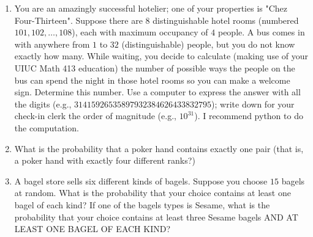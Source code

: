 \documentclass{report}
\begin{document}
{\begin{enumerate}
    \item You are an amazingly successful hotelier; one of your properties is "Chez Four-Thirteen".
          Suppose there are $8$ distinguishable hotel rooms (numbered $101, 102,\dots,108$), each with maximum
          occupancy of $4$ people. A bus comes in with anywhere from $1$ to $32$ (distinguishable) people, but you
          do not know exactly how many. While waiting, you decide to calculate (making use of your UIUC Math
          413 education) the number of possible ways the people on the bus can spend the night in those hotel
          rooms so you can make a welcome sign. Determine this number. Use a computer to express the answer
          with all the digits (e.g., $31415926535897932384626433832795$); write down for your check-in clerk
          the order of magnitude (e.g., $10^{31}$). I recommend python to do the computation.
    \item What is the probability that a poker hand contains exactly one pair
          (that is, a poker hand with exactly four different ranks?)


    \item A bagel store sells six different kinds of bagels. Suppose you choose $15$ bagels at random.
          What is the probability that your choice contains at least one bagel of each kind?
          If one of the bagels types is Sesame, what is the probability that your choice contains at
          least three Sesame bagels AND AT LEAST ONE BAGEL OF EACH KIND?

\end{enumerate}}
\end{document}
